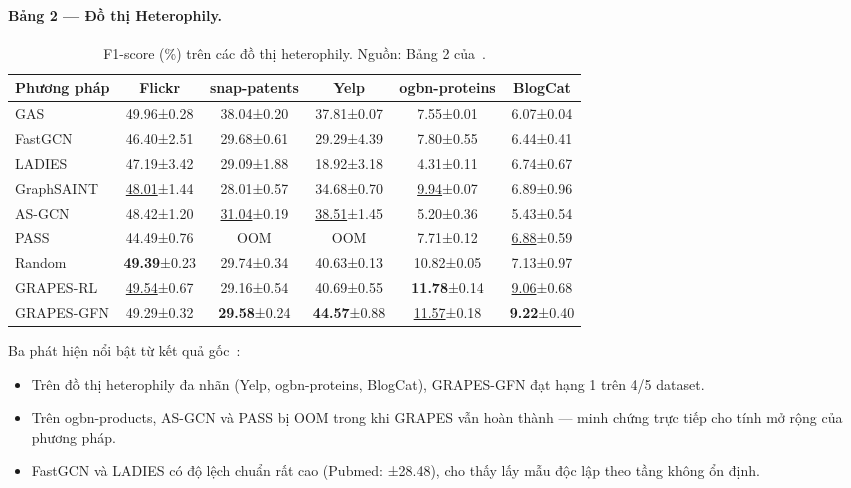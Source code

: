 \paragraph{Bảng 2 — Đồ thị Heterophily.}

\begin{table}[H]
\centering
\caption{F1-score (\%) trên các đồ thị heterophily. Nguồn: Bảng 2 của~\cite{Younesian2023GRAPES}.}
\label{tab:ketqua_f1_hetero}
\small
\setlength{\tabcolsep}{5pt}
\begin{tabular}{l c c c c c}
\toprule
\textbf{Phương pháp} & \textbf{Flickr} & \textbf{snap-patents} & \textbf{Yelp} & \textbf{ogbn-proteins} & \textbf{BlogCat} \\
\midrule
GAS             & 49.96±0.28 & 38.04±0.20 & 37.81±0.07 & 7.55±0.01 & 6.07±0.04 \\
\midrule
FastGCN         & 46.40±2.51 & 29.68±0.61 & 29.29±4.39 & 7.80±0.55 & 6.44±0.41 \\
LADIES          & 47.19±3.42 & 29.09±1.88 & 18.92±3.18 & 4.31±0.11 & 6.74±0.67 \\
GraphSAINT      & \underline{48.01}±1.44 & 28.01±0.57 & 34.68±0.70 & \underline{9.94}±0.07 & 6.89±0.96 \\
AS-GCN          & 48.42±1.20 & \underline{31.04}±0.19 & \underline{38.51}±1.45 & 5.20±0.36 & 5.43±0.54 \\
PASS            & 44.49±0.76 & OOM & OOM & 7.71±0.12 & \underline{6.88}±0.59 \\
Random          & \textbf{49.39}±0.23 & 29.74±0.34 & 40.63±0.13 & 10.82±0.05 & 7.13±0.97 \\
\midrule
GRAPES-RL       & \underline{49.54}±0.67 & 29.16±0.54 & 40.69±0.55 & \textbf{11.78}±0.14 & \underline{9.06}±0.68 \\
GRAPES-GFN      & 49.29±0.32 & \textbf{29.58}±0.24 & \textbf{44.57}±0.88 & \underline{11.57}±0.18 & \textbf{9.22}±0.40 \\
\bottomrule
\end{tabular}
\end{table}

Ba phát hiện nổi bật từ kết quả gốc~\cite{Younesian2023GRAPES}:
\begin{itemize}
    \item Trên đồ thị heterophily đa nhãn (Yelp, ogbn-proteins, BlogCat), GRAPES-GFN đạt hạng 1 trên 4/5 dataset.
    \item Trên ogbn-products, AS-GCN và PASS bị OOM trong khi GRAPES vẫn hoàn thành --- minh chứng trực tiếp cho tính mở rộng của phương pháp.
    \item FastGCN và LADIES có độ lệch chuẩn rất cao (Pubmed: ±28.48), cho thấy lấy mẫu độc lập theo tầng không ổn định.
\end{itemize}

